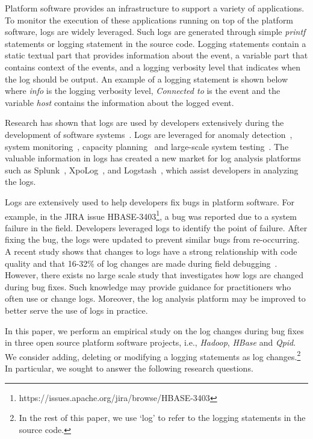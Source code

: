 Platform software provides an infrastructure to support a variety of applications. To monitor the execution of these applications
running on top of the platform software, logs are widely leveraged. Such logs are generated through simple \textsl{printf} statements or logging statement in the source code. Logging statements contain a static textual part that provides information about the event, a variable part that contains context of the events, and a logging verbosity level that indicates when the log should be output. An example of a logging statement is shown below where \emph{info} is the logging verbosity level, \emph{Connected to} is the event and the variable \emph{host} contains the information about the logged event. 



Research has shown that logs are used by developers extensively during the development of software systems~\cite{Characterizinglogs}. Logs are leveraged for anomaly detection~\cite{XUanomalies,ConsoleLogs,Marksyer}, system monitoring~\cite{Bitperformance}, capacity planning~\cite{IanWCRE} and large-scale system testing~\cite{markTesting}. The valuable information in logs has created a new market for log analysis platforms such as Splunk~\cite{Bitperformance}, XpoLog~\cite{Xpolog}, and Logstash~\cite{Logstash}, which assist developers in analyzing the logs.

 
Logs are extensively used to help developers fix bugs in platform software. For example, in the JIRA issue HBASE-3403\footnote{https://issues.apache.org/jira/browse/HBASE-3403}, a bug was reported due to a system failure in the field. Developers leveraged logs to identify the point of failure. After fixing the bug, the logs were updated to prevent similar bugs from re-occurring. A recent study shows that changes to logs have a strong relationship with code quality and that 16-32\%
of log changes are made during field debugging~\cite{EMSEIAN}. However, there exists no large scale study that investigates how logs are changed during bug fixes. Such knowledge may provide guidance for practitioners who often use or change logs. Moreover, the log analysis platform may be improved to better serve the use of logs in practice.

In this paper, we perform an empirical study on the log changes during bug fixes in three open source platform software projects, i.e., \emph{Hadoop}, \emph{HBase} and \emph{Qpid}. We consider adding, deleting or modifying a logging statements as log changes.\footnote{In the rest of this paper, we use `log' to refer to the logging statements in the source code.} In particular, we sought to answer the following research questions. 

